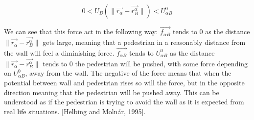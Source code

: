 \begin{equation}
0< U_{B} \left( \| \vec{r_{\alpha}} - \vec{r_{B}^{\alpha}} \| \right) < U^0_{\alpha B}
\end{equation}

We can see that this force act in the following way: $\vec{f_{\alpha B}}$ tends to 0 as the distance 
$\| \vec{r_{\alpha}} - \vec{r_{B}^{\alpha}} \|$ gets large, meaning that a pedestrian in a reasonably 
distance from the wall will feel a diminishing force. $\vec{f_{\alpha B}}$ tends to $U^0_{\alpha B}$ 
as the distance $ \| \vec{r_{\alpha}} - \vec{r_{B}^{\alpha}} \|$ tends to $0$ the pedestrian will be 
pushed, with some force depending on $U^0_{\alpha B}$, away from the wall. The negative of the force 
means that when the potential between wall and pedestrian rises so will the force, but in the opposite 
direction meaning that the pedestrian will be pushed away. This can be understood as if the pedestrian 
is trying to avoid the wall as it is expected from real life situations. [Helbing and Molnár, 1995]. %

